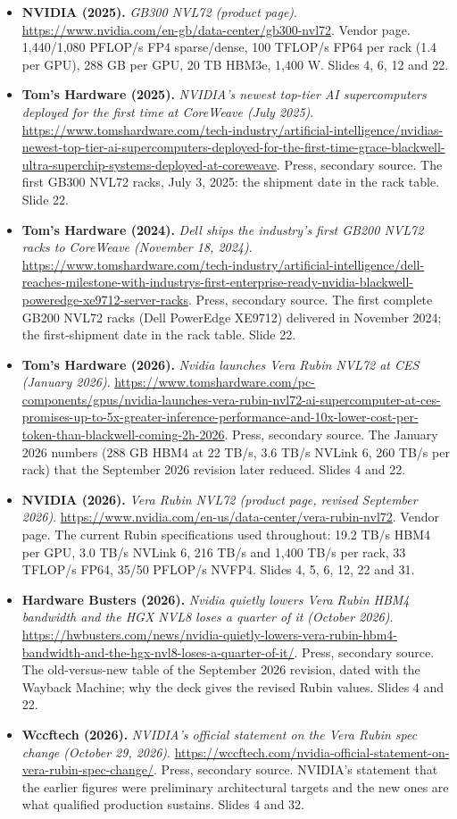 \documentclass[11pt,letterpaper]{article}
\begin{document}
\begin{itemize}[leftmargin=1.2em,itemsep=3pt]
\item \textbf{NVIDIA (2025).} \textit{GB300 NVL72 (product page)}. \url{https://www.nvidia.com/en-gb/data-center/gb300-nvl72}. Vendor page. 1,440/1,080 PFLOP/s FP4 sparse/dense, 100 TFLOP/s FP64 per rack (1.4 per GPU), 288 GB per GPU, 20 TB HBM3e, 1,400 W. Slides 4, 6, 12 and 22.
\item \textbf{Tom's Hardware (2025).} \textit{NVIDIA's newest top-tier AI supercomputers deployed for the first time at CoreWeave (July 2025)}. \url{https://www.tomshardware.com/tech-industry/artificial-intelligence/nvidias-newest-top-tier-ai-supercomputers-deployed-for-the-first-time-grace-blackwell-ultra-superchip-systems-deployed-at-coreweave}. Press, secondary source. The first GB300 NVL72 racks, July 3, 2025: the shipment date in the rack table. Slide 22.
\item \textbf{Tom's Hardware (2024).} \textit{Dell ships the industry's first GB200 NVL72 racks to CoreWeave (November 18, 2024)}. \url{https://www.tomshardware.com/tech-industry/artificial-intelligence/dell-reaches-milestone-with-industrys-first-enterprise-ready-nvidia-blackwell-poweredge-xe9712-server-racks}. Press, secondary source. The first complete GB200 NVL72 racks (Dell PowerEdge XE9712) delivered in November 2024; the first-shipment date in the rack table. Slide 22.
\item \textbf{Tom's Hardware (2026).} \textit{Nvidia launches Vera Rubin NVL72 at CES (January 2026)}. \url{https://www.tomshardware.com/pc-components/gpus/nvidia-launches-vera-rubin-nvl72-ai-supercomputer-at-ces-promises-up-to-5x-greater-inference-performance-and-10x-lower-cost-per-token-than-blackwell-coming-2h-2026}. Press, secondary source. The January 2026 numbers (288 GB HBM4 at 22 TB/s, 3.6 TB/s NVLink 6, 260 TB/s per rack) that the September 2026 revision later reduced. Slides 4 and 22.
\item \textbf{NVIDIA (2026).} \textit{Vera Rubin NVL72 (product page, revised September 2026)}. \url{https://www.nvidia.com/en-us/data-center/vera-rubin-nvl72}. Vendor page. The current Rubin specifications used throughout: 19.2 TB/s HBM4 per GPU, 3.0 TB/s NVLink 6, 216 TB/s and 1,400 TB/s per rack, 33 TFLOP/s FP64, 35/50 PFLOP/s NVFP4. Slides 4, 5, 6, 12, 22 and 31.
\item \textbf{Hardware Busters (2026).} \textit{Nvidia quietly lowers Vera Rubin HBM4 bandwidth and the HGX NVL8 loses a quarter of it (October 2026)}. \url{https://hwbusters.com/news/nvidia-quietly-lowers-vera-rubin-hbm4-bandwidth-and-the-hgx-nvl8-loses-a-quarter-of-it/}. Press, secondary source. The old-versus-new table of the September 2026 revision, dated with the Wayback Machine; why the deck gives the revised Rubin values. Slides 4 and 22.
\item \textbf{Wccftech (2026).} \textit{NVIDIA's official statement on the Vera Rubin spec change (October 29, 2026)}. \url{https://wccftech.com/nvidia-official-statement-on-vera-rubin-spec-change/}. Press, secondary source. NVIDIA's statement that the earlier figures were preliminary architectural targets and the new ones are what qualified production sustains. Slides 4 and 32.
\end{itemize}
\end{document}
